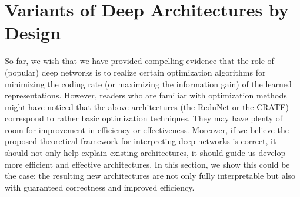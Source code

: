 \documentclass[../../book-main.tex]{subfiles}
\begin{document}
\begin{table}[t!]
\centering
\caption{\small Top-1 classification accuracy of \textsc{crate} on various datasets with different model scales 
when pre-trained on ImageNet-1K. For ImageNet-1K/ImageNet-1K ReaL, we directly evaluate the top-1 accuracy. For other datasets, we use models that are pre-trained on ImageNet as initialization and the evaluate the transfer learning performance via fine-tuning.}
\label{tab:crate_comparison_with_sota}
\small
    \setlength{\tabcolsep}{13.6pt}
\end{table}



\section{Variants of Deep Architectures by Design} \label{sec:chap4-derive-white-box-transformer-variants}

So far, we wish that we have provided compelling evidence that the role of (popular) deep networks is to realize certain optimization algorithms for minimizing the coding rate (or maximizing the information gain) of the learned representations. However, readers who are familiar with optimization methods might have noticed that the above architectures (the ReduNet or the CRATE) correspond to rather basic optimization techniques. They may have plenty of room for improvement in efficiency or effectiveness. Moreover, if we believe the proposed theoretical framework for interpreting deep networks is correct, it should not only help explain existing architectures, it should guide us develop more efficient and effective architectures. In this section, we show this could be the case: the resulting new architectures are not only fully interpretable but also with guaranteed correctness and improved efficiency. 
\end{document}
